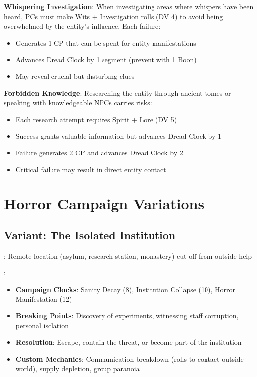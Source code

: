 \documentclass[11pt]{article}
\begin{document}
\begin{mdframed}[backgroundcolor=sanitybg]
\textbf{Whispering Investigation}: When investigating areas where whispers have been heard, PCs must make Wits + Investigation rolls (DV 4) to avoid being overwhelmed by the entity's influence. Each failure:
\begin{itemize}[leftmargin=*]
\item Generates 1 CP that can be spent for entity manifestations
\item Advances Dread Clock by 1 segment (prevent with 1 Boon)
\item May reveal crucial but disturbing clues
\end{itemize}

\textbf{Forbidden Knowledge}: Researching the entity through ancient tomes or speaking with knowledgeable NPCs carries risks:
\begin{itemize}[leftmargin=*]
\item Each research attempt requires Spirit + Lore (DV 5)
\item Success grants valuable information but advances Dread Clock by 1
\item Failure generates 2 CP and advances Dread Clock by 2
\item Critical failure may result in direct entity contact
\end{itemize}
\end{mdframed}

\section*{Horror Campaign Variations}

\subsection*{Variant: The Isolated Institution}

\begin{description}[leftmargin=*]
\item[Setting]: Remote location (asylum, research station, monastery) cut off from outside help
\item[Key Elements]:
\begin{itemize}[leftmargin=*]
\item \textbf{Campaign Clocks}: Sanity Decay (8), Institution Collapse (10), Horror Manifestation (12)
\item \textbf{Breaking Points}: Discovery of experiments, witnessing staff corruption, personal isolation
\item \textbf{Resolution}: Escape, contain the threat, or become part of the institution
\item \textbf{Custom Mechanics}: Communication breakdown (rolls to contact outside world), supply depletion, group paranoia
\end{itemize}
\end{description}
\end{document}
